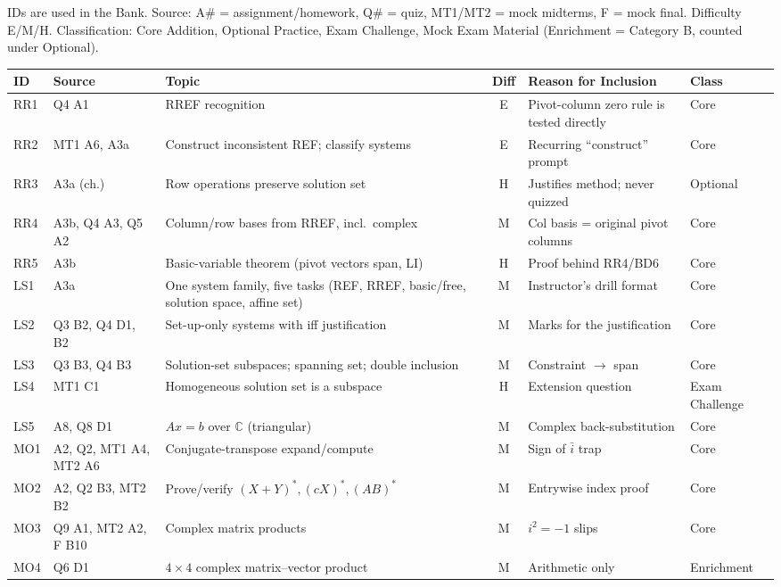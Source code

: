 IDs are used in the Bank. Source: A\# = assignment/homework, Q\# = quiz, MT1/MT2 = mock midterms, F = mock final. Difficulty E/M/H. Classification: Core Addition, Optional Practice, Exam Challenge, Mock Exam Material (Enrichment = Category B, counted under Optional).
{\footnotesize\begin{longtable}{@{}l p{2.6cm} p{5.2cm} c p{3.9cm} p{1.7cm}@{}}\toprule \textbf{ID}&\textbf{Source}&\textbf{Topic}&\textbf{Diff}&\textbf{Reason for Inclusion}&\textbf{Class}\\\midrule\endhead
RR1 & Q4 A1 & RREF recognition & E & Pivot-column zero rule is tested directly & Core\\
RR2 & MT1 A6, A3a & Construct inconsistent REF; classify systems & E & Recurring ``construct'' prompt & Core\\
RR3 & A3a (ch.) & Row operations preserve solution set & H & Justifies method; never quizzed & Optional\\
RR4 & A3b, Q4 A3, Q5 A2 & Column/row bases from RREF, incl.\ complex & M & Col basis = original pivot columns & Core\\
RR5 & A3b & Basic-variable theorem (pivot vectors span, LI) & H & Proof behind RR4/BD6 & Core\\
LS1 & A3a & One system family, five tasks (REF, RREF, basic/free, solution space, affine set) & M & Instructor's drill format & Core\\
LS2 & Q3 B2, Q4 D1, B2 & Set-up-only systems with iff justification & M & Marks for the justification & Core\\
LS3 & Q3 B3, Q4 B3 & Solution-set subspaces; spanning set; double inclusion & M & Constraint $\to$ span & Core\\
LS4 & MT1 C1 & Homogeneous solution set is a subspace & H & Extension question & Exam Challenge\\
LS5 & A8, Q8 D1 & $Ax=b$ over $\mathbb C$ (triangular) & M & Complex back-substitution & Core\\
MO1 & A2, Q2, MT1 A4, MT2 A6 & Conjugate-transpose expand/compute & M & Sign of $\bar i$ trap & Core\\
MO2 & A2, Q2 B3, MT2 B2 & Prove/verify $(X{+}Y)^*,(cX)^*,(AB)^*$ & M & Entrywise index proof & Core\\
MO3 & Q9 A1, MT2 A2, F B10 & Complex matrix products & M & $i^2=-1$ slips & Core\\
MO4 & Q6 D1 & $4\times4$ complex matrix--vector product & M & Arithmetic only & Enrichment\\

\end{longtable}}
